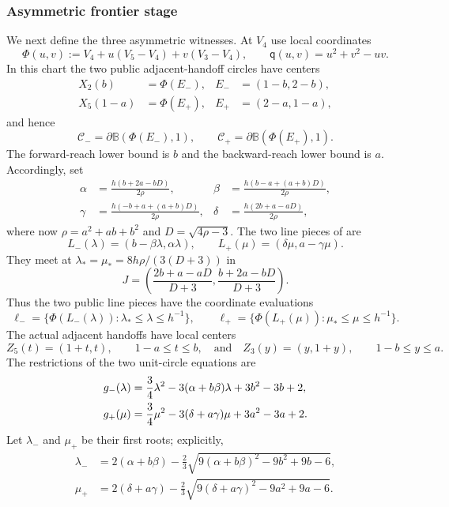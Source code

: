 \subsubsection*{Asymmetric frontier stage}

We next define the three asymmetric witnesses.  At $V_4$ use local
coordinates
\[
 \Phi(u,v):=V_4+u(V_5-V_4)+v(V_3-V_4),\qquad
 \mathsf q(u,v)=u^2+v^2-uv.
\]
In this chart the two public adjacent-handoff circles have centers
\[
 \begin{aligned}
 X_2(b)&=\Phi(E_-),& E_-&=(1-b,2-b),\\
 X_5(1-a)&=\Phi(E_+),& E_+&=(2-a,1-a),
 \end{aligned}
\]
and hence
\[
 \mathcal C_-=\partial\mathbb B(\Phi(E_-),1),
 \qquad
 \mathcal C_+=\partial\mathbb B(\Phi(E_+),1).
\]
The forward-reach lower bound is $b$ and the backward-reach lower bound is $a$.  Accordingly,
set
\begin{align*}
 \alpha&=\frac{h(b+2a-bD)}{2\rho},&
 \beta&=\frac{h(b-a+(a+b)D)}{2\rho},\\
 \gamma&=\frac{h(-b+a+(a+b)D)}{2\rho},&
 \delta&=\frac{h(2b+a-aD)}{2\rho},
\end{align*}
where now $\rho=a^2+ab+b^2$ and $D=\sqrt{4\rho-3}$.  The two line pieces of
 are
\[
 L_-(\lambda)=(b-\beta\lambda,\alpha\lambda),\qquad
 L_+(\mu)=(\delta\mu,a-\gamma\mu).
\]
They meet at $\lambda_* =\mu_*=8h\rho/(3(D+3))$ in
\begin{equation}
 J=\left(\frac{2b+a-aD}{D+3},
          \frac{b+2a-bD}{D+3}\right).           \label{eq:line-junction}
\end{equation}
Thus the two public line pieces have the coordinate evaluations
\[
 \ell_-=\{\Phi(L_-(\lambda)):\lambda_*\le\lambda\le h^{-1}\},
 \qquad
 \ell_+=\{\Phi(L_+(\mu)):\mu_*\le\mu\le h^{-1}\}.
\]
The actual adjacent handoffs have local centers
\[
 Z_5(t)=(1+t,t),\qquad 1-a\le t\le b,
 \quad\text{and}\quad
 Z_3(y)=(y,1+y),\qquad 1-b\le y\le a.
\]
The restrictions of the two unit-circle equations are
\begin{align}
 g_-(\lambda)&=\frac34\lambda^2
 -3(\alpha+b\beta)\lambda+3b^2-3b+2,\notag\\
 g_+(\mu)&=\frac34\mu^2
 -3(\delta+a\gamma)\mu+3a^2-3a+2.              \label{eq:witness-quadratics}
\end{align}
Let $\lambda_-$ and $\mu_+$ be their first roots; explicitly,
\begin{align*}
 \lambda_-&=2(\alpha+b\beta)
 -\frac23\sqrt{9(\alpha+b\beta)^2-9b^2+9b-6},\\
 \mu_+&=2(\delta+a\gamma)
 -\frac23\sqrt{9(\delta+a\gamma)^2-9a^2+9a-6}.
\end{align*}

